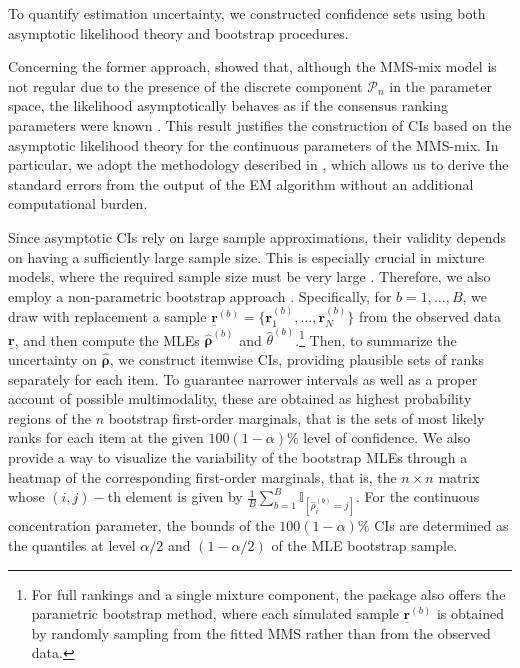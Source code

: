 To quantify estimation uncertainty, we constructed confidence sets using both asymptotic likelihood theory and bootstrap procedures.

Concerning the former approach, \cite{critchlow85metric} showed that, although the MMS-mix model is not regular due to the presence of the discrete component $\mathcal{P}_n$ in the parameter space, the likelihood asymptotically behaves as if the consensus ranking parameters were known \citep{Marden1995}. This result justifies the construction of CIs based on the asymptotic likelihood theory
for the continuous parameters of the MMS-mix. In particular, we adopt the methodology described in \citet{mclachan2000}, which
allows us to derive the standard errors from the output of the EM algorithm without an additional computational burden.

Since asymptotic CIs rely on large sample approximations, their validity depends on having a sufficiently large sample size. This is especially crucial in mixture models, where the required sample size must be very large \citep{mclachan2000}. Therefore, we also employ a non-parametric bootstrap approach \citep{efron82boot}.
Specifically, for $b=1,\dots,B$, we draw with replacement a sample $\underline{\bm r}^{(b)} =\{\bm r_1^{(b)},\dots,\bm r_N^{(b)}\}$ from the observed data $\underline{\bm r}$, and then compute the MLEs $\hat{\bm\rho}^{(b)}$ and $\hat{\theta}^{(b)}$.\footnote{
 For full rankings and a single mixture component, the  package also offers the parametric bootstrap method, where each simulated sample $\underline{\bm r}^{(b)}$ is obtained by randomly sampling from the fitted MMS rather than from the observed data.}
Then, to summarize the uncertainty on $\hat{\bm\rho}$, we construct itemwise CIs, providing plausible sets of ranks separately for each item. To guarantee narrower intervals as well as a proper account of possible multimodality, these are obtained as highest probability regions of the $n$ bootstrap first-order marginals, that is the sets of most likely ranks for each item at the given $100(1-\alpha)\%$ level of confidence.
We also provide a way to visualize the variability of the bootstrap MLEs through a heatmap of the corresponding first-order marginals, that is, the $n\times n$ matrix whose $(i,j)-$th element is given by $\frac{1}{B}\sum_{b=1}^{B} \mathbb{I}_{[\hat{\rho}^{(b)}_i=j]}$. For the continuous concentration parameter, the bounds of the $100(1-\alpha)\%$ CIs are determined as the quantiles at level $\alpha/2$ and $(1 - \alpha/2)$ of the MLE bootstrap sample.

